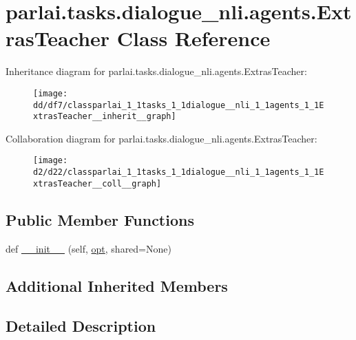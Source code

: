 \hypertarget{classparlai_1_1tasks_1_1dialogue__nli_1_1agents_1_1ExtrasTeacher}{}\section{parlai.\+tasks.\+dialogue\+\_\+nli.\+agents.\+Extras\+Teacher Class Reference}
\label{classparlai_1_1tasks_1_1dialogue__nli_1_1agents_1_1ExtrasTeacher}


Inheritance diagram for parlai.\+tasks.\+dialogue\+\_\+nli.\+agents.\+Extras\+Teacher\+:
\nopagebreak
\begin{figure}[H]
\begin{center}
\leavevmode
\texttt{[image: dd/df7/classparlai\_1\_1tasks\_1\_1dialogue\_\_nli\_1\_1agents\_1\_1ExtrasTeacher\_\_inherit\_\_graph]}
\end{center}
\end{figure}


Collaboration diagram for parlai.\+tasks.\+dialogue\+\_\+nli.\+agents.\+Extras\+Teacher\+:
\nopagebreak
\begin{figure}[H]
\begin{center}
\leavevmode
\texttt{[image: d2/d22/classparlai\_1\_1tasks\_1\_1dialogue\_\_nli\_1\_1agents\_1\_1ExtrasTeacher\_\_coll\_\_graph]}
\end{center}
\end{figure}
\subsection*{Public Member Functions}
\begin{DoxyCompactItemize}
\item 
def \hyperlink{classparlai_1_1tasks_1_1dialogue__nli_1_1agents_1_1ExtrasTeacher_a5713e0c8aa5f0dc996004e7028c7725b}{\+\_\+\+\_\+init\+\_\+\+\_\+} (self, \hyperlink{classparlai_1_1core_1_1agents_1_1Teacher_a3ce6243860ce978a897922863ed32fa4}{opt}, shared=None)
\end{DoxyCompactItemize}
\subsection*{Additional Inherited Members}


\subsection{Detailed Description}


